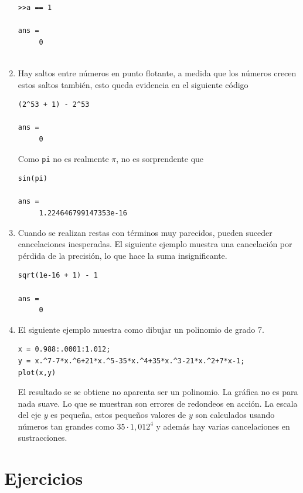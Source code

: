 \documentclass[11pt]{article}
\begin{document}
\begin{enumerate}
\begin{verbatim}
>>a == 1

ans =
     0
     
\end{verbatim}

\item Hay saltos entre n\'umeros en punto flotante, a medida que los n\'umeros crecen estos saltos tambi\'en, esto queda evidencia en el siguiente c\'odigo

\begin{verbatim}
(2^53 + 1) - 2^53

ans =
     0
\end{verbatim}

Como \texttt{pi} no es realmente $\pi$, no es sorprendente que 

\begin{verbatim}
sin(pi)

ans =
     1.224646799147353e-16
\end{verbatim}

\item Cuando se realizan restas con t\'erminos muy parecidos, pueden suceder cancelaciones inesperadas. El siguiente ejemplo 
muestra una cancelaci\'on por p\'erdida de la precisi\'on, lo que hace la suma insignificante. 

\begin{verbatim}
sqrt(1e-16 + 1) - 1

ans =
     0
\end{verbatim}

\item El siguiente ejemplo muestra como dibujar un polinomio de grado 7.

\begin{verbatim}
x = 0.988:.0001:1.012;
y = x.^7-7*x.^6+21*x.^5-35*x.^4+35*x.^3-21*x.^2+7*x-1;
plot(x,y)
\end{verbatim}

El resultado se se obtiene no aparenta ser un polinomio. La gr\'afica no es para nada suave. Lo 
que se muestran son errores de redondeos en acci\'on. La escala del eje $y$ es pequeña, estos pequeños valores de $y$ 
son calculados usando n\'umeros tan grandes como $35 \cdot 1,012^4$  y adem\'as hay varias cancelaciones en sustracciones.

\end{enumerate}

\section{\textbf{Ejercicios}}
\end{document}

